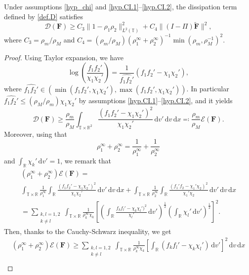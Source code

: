 \documentclass[10pt,a4paper]{amsart}
\newcommand{\Fbf}{\mathbf{F}}
\newcommand{\Ftbf}{\mathbf{\Ft}}
\newcommand{\Ft}{{\widetilde{F}}}
\newcommand{\R}{\mathbb{R}}
\newcommand{\T}{\mathbb{T}}
\newcommand{\dd}{\,\mathrm{d}}
\begin{document}
\begin{Lemma}\label{lem_estimD}
Under assumptions \eqref{hyp_chi} and \eqref{hyp.CI.1}--\eqref{hyp.CI.2}, the dissipation term defined by \eqref{def.D} satisfies
\begin{equation}\label{estim.D}
    \mathcal{D}(\Fbf)\geq C_3\|1-\rho_1\rho_2\|_{L^2(\T)}^2+C_4\|(I-\Pi)\Ftbf\|^2,
\end{equation}
where $C_3=\rho_m/\rho_M$ and $C_4=(\rho_m/\rho_M)(\rho_1^\infty+\rho_2^\infty)^{-1}\min(\rho_m,\rho_M^{-1})^2$.
\end{Lemma}

\begin{proof}
Using Taylor expansion, we have
\[\log\left(\frac{f_1f_2'}{\chi_1\chi_2'}\right)=\frac{1}{\widehat{f_1f_2'}}(f_1f_2'-\chi_1\chi_2'),\]
where $\widehat{f_1f_2'} \in \left(\min(f_1f_2', \chi_1\chi_2'),\max(f_1f_2', \chi_1\chi_2')\right)$. In particular $\widehat{f_1f_2'}\leq (\rho_M/\rho_m)\chi_1\chi_2'$ by assumptions \eqref{hyp.CI.1}--\eqref{hyp.CI.2}, and it yields
\begin{equation}\label{estim.Da}
    \mathcal{D}(\Fbf)\geq \frac{\rho_m}{\rho_M}\int_{\T\times\R^2}\frac{(f_1f_2'-\chi_1\chi_2')^2}{\chi_1\chi_2'}\dd v'\dd v\dd x\eqcolon\frac{\rho_m}{\rho_M}\mathcal{E}(\Fbf).
\end{equation}
Moreover, using that 
\[\rho_1^\infty+\rho_2^\infty=\frac{1}{\rho_1^\infty}+\frac{1}{\rho_2^\infty}\]
and $\int_\R \chi_k'\dd v'=1$, we remark that 
\begin{gather*}
    (\rho_1^\infty+\rho_2^\infty)\mathcal{E}(\Fbf)=\\
    \int_{\T\times\R}\frac{1}{\rho_1^\infty}\int_\R\frac{(f_1f_2'-\chi_1\chi_2')^2}{\chi_1\chi_2'}\dd v'\dd v\dd x+ \int_{\T\times\R}\frac{1}{\rho_2^\infty}\int_\R\frac{(f_1'f_2-\chi_1'\chi_2)^2}{\chi_1'\chi_2}\dd v'\dd v\dd x\\
    = \sum_{\substack{k,l=1,2\\ k\neq l}}\int_{\T\times\R}\frac{1}{\rho_k^\infty\chi_k}\left[\left(\int_\R\frac{f_kf_l'-\chi_k\chi_l')^2}{\chi_l'}\dd v'\right)^{\frac{1}{2}}\left(\int_\R \chi_l'\dd v'\right)^{\frac{1}{2}}\right]^2.
\end{gather*}
Then, thanks to the Cauchy-Schwarz inequality, we get
\begin{gather*}
(\rho_1^\infty+\rho_2^\infty)\mathcal{E}(\Fbf) \geq \sum_{\substack{k,l=1,2\\ k\neq l}}\int_{\T\times\R}\frac{1}{\rho_k^\infty\chi_k}\left[\int_\R(f_kf_l'-\chi_k\chi_l')\dd v'\right]^2\dd v\dd x\\

\end{gather*}
\end{proof}
\end{document}
